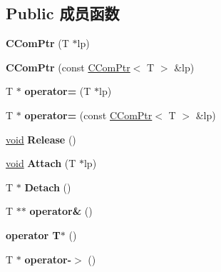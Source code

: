 \subsection*{Public 成员函数}
\begin{DoxyCompactItemize}
\item 
\mbox{\label{class_a_t_l_1_1_c_com_ptr_ae5fc102aba4b7f0bb752f9d849902b39}} 
{\bfseries C\+Com\+Ptr} (T $\ast$lp)
\item 
\mbox{\label{class_a_t_l_1_1_c_com_ptr_a29baca0e0c4292297be627266e7c5962}} 
{\bfseries C\+Com\+Ptr} (const \hyperlink{class_a_t_l_1_1_c_com_ptr}{C\+Com\+Ptr}$<$ T $>$ \&lp)
\item 
\mbox{\label{class_a_t_l_1_1_c_com_ptr_a5cce219e33ce5a6ab27c5e3ab974e4ff}} 
T $\ast$ {\bfseries operator=} (T $\ast$lp)
\item 
\mbox{\label{class_a_t_l_1_1_c_com_ptr_a6a8a399de0645dd5eee5748b383a7300}} 
T $\ast$ {\bfseries operator=} (const \hyperlink{class_a_t_l_1_1_c_com_ptr}{C\+Com\+Ptr}$<$ T $>$ \&lp)
\item 
\mbox{\label{class_a_t_l_1_1_c_com_ptr_ac3ca27d948da196ecf9d3a5db88bffa3}} 
\hyperlink{interfacevoid}{void} {\bfseries Release} ()
\item 
\mbox{\label{class_a_t_l_1_1_c_com_ptr_aceac5b7b0563520766eb659dec7155f7}} 
\hyperlink{interfacevoid}{void} {\bfseries Attach} (T $\ast$lp)
\item 
\mbox{\label{class_a_t_l_1_1_c_com_ptr_a3da279e47a25d4a1ef11f8b207d1bbe7}} 
T $\ast$ {\bfseries Detach} ()
\item 
\mbox{\label{class_a_t_l_1_1_c_com_ptr_ae610aeb9e152d94d102b791316e4595a}} 
T $\ast$$\ast$ {\bfseries operator\&} ()
\item 
\mbox{\label{class_a_t_l_1_1_c_com_ptr_a086d4f99c4f3ffab20d2b8f5f884f963}} 
{\bfseries operator T$\ast$} ()
\item 
\mbox{\label{class_a_t_l_1_1_c_com_ptr_a9b2ed740bb0432113216afcaf14eca4c}} 
T $\ast$ {\bfseries operator-\/$>$} ()
\end{DoxyCompactItemize}
